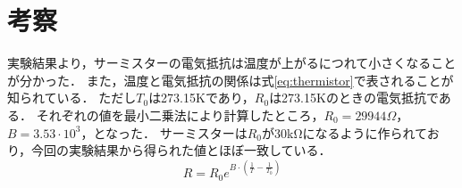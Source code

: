 \documentclass[a4paper,11pt]{ltjsarticle}
\begin{document}
\section{考察}
実験結果より，サーミスターの電気抵抗は温度が上がるにつれて小さくなることが分かった．
また，温度と電気抵抗の関係は式\eqref{eq:thermistor}で表されることが知られている．
ただし$T_0$は273.15Kであり，$R_0$は273.15Kのときの電気抵抗である．
それぞれの値を最小二乗法により計算したところ，$R_0 = 29944Ω$，$B = 3.53 \cdot 10^3$，となった．
サーミスターは$R_0$が30kΩになるように作られており，今回の実験結果から得られた値とほぼ一致している．
\begin{equation}
  R = R_0 e^{ B \cdot \left( \frac{1}{T} - \frac{1}{T_0} \right)}
  \label{eq:thermistor}
\end{equation}
\end{document}
